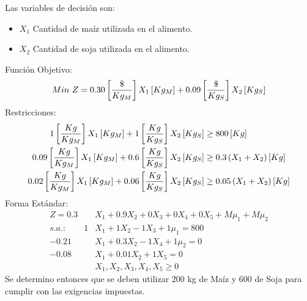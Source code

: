 \documentclass{tarea}
\begin{document}
\begin{homeworkProblem}
Las variables de decisión son:
\begin{itemize}
	\item $X_1$ Cantidad de maíz utilizada en el alimento.
	\item $X_2$ Cantidad de soja utilizada en el alimento.
\end{itemize}
Función Objetivo: 
\begin{equation}
	Min\ Z = 0.30\left[ \frac{\$}{Kg_M} \right]X_1\left[ Kg_M \right] + 0.09\left[ \frac{\$}{Kg_S} \right]X_2\left[ Kg_S \right]
\end{equation}
Restricciones:
\begin{align*}
	1\left[ \frac{Kg}{Kg_M} \right]X_1\left[ Kg_M \right] + 1\left[ \frac{Kg}{Kg_S} \right]X_2\left[ Kg_S \right] &\ge 800\left[ Kg \right] \\
	0.09\left[ \frac{Kg}{Kg_M} \right]X_1\left[ Kg_M \right] + 0.6\left[ \frac{Kg}{Kg_S} \right]X_2\left[ Kg_S \right] &\ge 0.3\left( X_1 + X_2 \right)\left[ Kg \right] \\
	0.02\left[ \frac{Kg}{Kg_M} \right]X_1\left[ Kg_M \right] + 0.06\left[ \frac{Kg}{Kg_S} \right]X_2\left[ Kg_S \right] &\ge 0.05\left( X_1 + X_2 \right)\left[ Kg \right] \\
\end{align*}
Forma Estándar:
\begin{align*}
	Z=0.3&X_1 + 0.9X_2 + 0X_3 + 0X_4 + 0X_5 + M\mu_1 + M\mu_2 \\
	s.a.:\quad \quad  1&X_1 + 1X_2 - 1X_3 + 1\mu_1 = 800 \\
	-0.21&X_1 + 0.3X_2 - 1X_4 + 1\mu_2 = 0 \\
	-0.08&X_1 + 0.01X_2 + 1X_5 = 0 \\
	&X_1,X_2,X_3,X_4,X_5  \ge 0
\end{align*}
Se determino entonces que se deben utilizar 200 kg de Maíz y 600 de Soja para cumplir con las exigencias impuestas.
\end{homeworkProblem}
\end{document}
